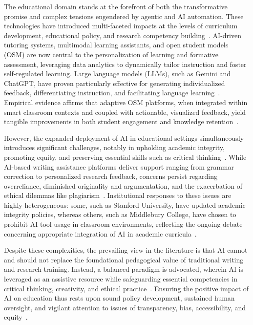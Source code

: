 The educational domain stands at the forefront of both the transformative promise and complex tensions engendered by agentic and AI automation. These technologies have introduced multi-faceted impacts at the levels of curriculum development, educational policy, and research competency building~\cite{ref109,ref110,ref111,ref112,ref113,ref114,ref115}. AI-driven tutoring systems, multimodal learning assistants, and open student models (OSM) are now central to the personalization of learning and formative assessment, leveraging data analytics to dynamically tailor instruction and foster self-regulated learning. Large language models (LLMs), such as Gemini and ChatGPT, have proven particularly effective for generating individualized feedback, differentiating instruction, and facilitating language learning~\cite{ref109,ref110,ref111}. Empirical evidence affirms that adaptive OSM platforms, when integrated within smart classroom contexts and coupled with actionable, visualized feedback, yield tangible improvements in both student engagement and knowledge retention~\cite{ref110,ref111}.

However, the expanded deployment of AI in educational settings simultaneously introduces significant challenges, notably in upholding academic integrity, promoting equity, and preserving essential skills such as critical thinking~\cite{ref109,ref110,ref112,ref113,ref114,ref115}. While AI-based writing assistance platforms deliver support ranging from grammar correction to personalized research feedback, concerns persist regarding overreliance, diminished originality and argumentation, and the exacerbation of ethical dilemmas like plagiarism~\cite{ref109,ref110,ref112,ref113,ref114,ref115}. Institutional responses to these issues are highly heterogeneous: some, such as Stanford University, have updated academic integrity policies, whereas others, such as Middlebury College, have chosen to prohibit AI tool usage in classroom environments, reflecting the ongoing debate concerning appropriate integration of AI in academic curricula~\cite{ref109,ref110,ref113,ref114,ref115}.

Despite these complexities, the prevailing view in the literature is that AI cannot and should not replace the foundational pedagogical value of traditional writing and research training. Instead, a balanced paradigm is advocated, wherein AI is leveraged as an assistive resource while safeguarding essential competencies in critical thinking, creativity, and ethical practice~\cite{ref109,ref110,ref113,ref114,ref115}. Ensuring the positive impact of AI on education thus rests upon sound policy development, sustained human oversight, and vigilant attention to issues of transparency, bias, accessibility, and equity~\cite{ref110,ref111,ref113,ref114,ref115}.

